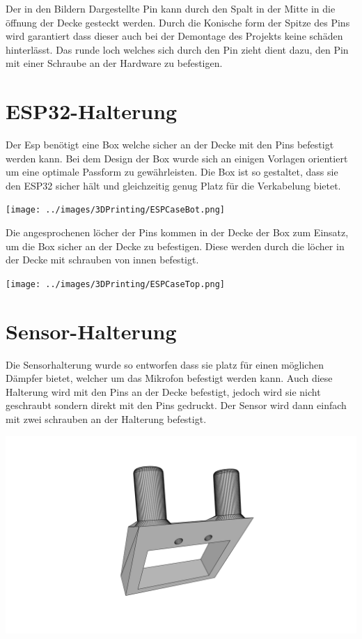 Der in den Bildern Dargestellte Pin kann durch den Spalt in der Mitte in die öffnung der Decke gesteckt werden.
Durch die Konische form der Spitze des Pins wird garantiert dass dieser auch bei der Demontage des Projekts keine schäden hinterlässt.
Das runde loch welches sich durch den Pin zieht dient dazu, den Pin mit einer Schraube an der Hardware zu befestigen.

\section{ESP32-Halterung}
Der Esp benötigt eine Box welche sicher an der Decke mit den Pins befestigt werden kann.
Bei dem Design der Box wurde sich an einigen Vorlagen orientiert um eine optimale Passform zu gewährleisten.
Die Box ist so gestaltet, dass sie den ESP32 sicher hält und gleichzeitig genug Platz für die Verkabelung bietet.

\begin{center}
  \texttt{[image: ../images/3DPrinting/ESPCaseBot.png]}
\end{center}

Die angesprochenen löcher der Pins kommen in der Decke der Box zum Einsatz, um die Box sicher an der Decke zu befestigen.
Diese werden durch die löcher in der Decke mit schrauben von innen befestigt.

\begin{center}
  \texttt{[image: ../images/3DPrinting/ESPCaseTop.png]}
\end{center}

\section{Sensor-Halterung}

Die Sensorhalterung wurde so entworfen dass sie platz für einen möglichen Dämpfer bietet,
welcher um das Mikrofon befestigt werden kann.
Auch diese Halterung wird mit den Pins an der Decke befestigt, jedoch wird sie nicht geschraubt sondern direkt mit den Pins gedruckt.
Der Sensor wird dann einfach mit zwei schrauben an der Halterung befestigt.

\begin{center}
  \includegraphics[width=1\textwidth]{../images/3DPrinting/SensorStand.png}
\end{center}


